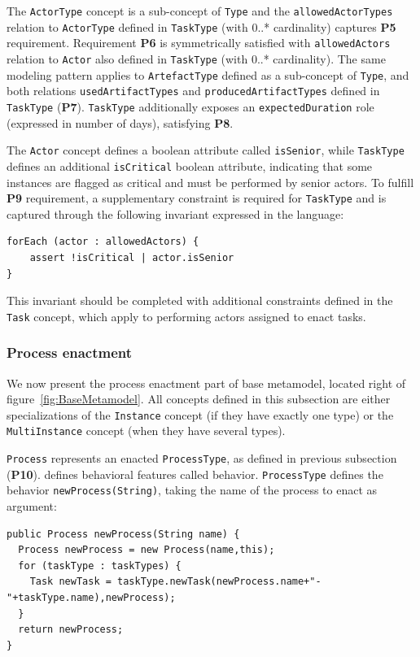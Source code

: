 The \texttt{ActorType} concept is a sub-concept of \texttt{Type} and the \texttt{allowedActorTypes} relation to \texttt{ActorType} defined in \texttt{TaskType} (with 0..* cardinality) captures \textbf{P5} requirement. Requirement \textbf{P6} is symmetrically satisfied with \texttt{allowedActors} relation to \texttt{Actor} also defined in \texttt{TaskType} (with 0..* cardinality). The same modeling pattern applies to \texttt{ArtefactType} defined as a sub-concept of \texttt{Type}, and both relations \texttt{usedArtifactTypes} and \texttt{producedArtifactTypes} defined in \texttt{TaskType} (\textbf{P7}). \texttt{TaskType} additionally exposes an \texttt{expectedDuration} role (expressed in number of days), satisfying \textbf{P8}.

The \texttt{Actor} concept defines a boolean attribute called \texttt{isSenior}, while \texttt{TaskType} defines an additional \texttt{isCritical} boolean attribute, indicating that some instances are flagged as critical and must be performed by senior actors. To fulfill \textbf{P9} requirement, a supplementary constraint is required for \texttt{TaskType} and is captured through the following invariant expressed in the \FML language:

\begin{lstlisting}
forEach (actor : allowedActors) {
    assert !isCritical | actor.isSenior
}
\end{lstlisting}

This invariant should be completed with additional constraints defined in the \texttt{Task} concept, which apply to performing actors assigned to enact tasks.

\subsubsection{Process enactment}
\label{sec:ProcessEnactment}
We now present the process enactment part of base metamodel, located right of figure~\ref{fig:BaseMetamodel}. All concepts defined in this subsection are either specializations of the \texttt{Instance} concept (if they have exactly one type) or the \texttt{MultiInstance} concept (when they have several types).

\texttt{Process} represents an enacted \texttt{ProcessType}, as defined in previous subsection (\textbf{P10}). \FML defines behavioral features called behavior. \texttt{ProcessType} defines the behavior \texttt{newProcess(String)}, taking the name of the process to enact as argument:

\begin{lstlisting}
public Process newProcess(String name) {
  Process newProcess = new Process(name,this);
  for (taskType : taskTypes) {
    Task newTask = taskType.newTask(newProcess.name+"-"+taskType.name),newProcess);
  }
  return newProcess;
}
\end{lstlisting}

